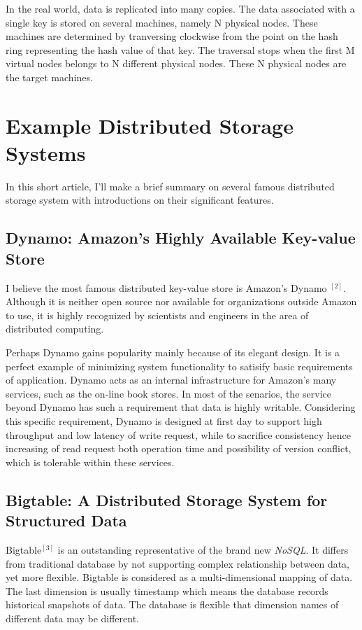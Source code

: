In the real world, data is replicated into many copies. The data associated
with a single key is stored on several machines, namely N physical nodes.
These machines are determined by tranversing clockwise from the point on the
hash ring representing the hash value of that key. The traversal stops when
the first M virtual nodes belongs to N different physical nodes. These N
physical nodes are the target machines.

\section*{Example Distributed Storage Systems}
In this short article, I'll make a brief summary on several famous distributed
storage system with introductions on their significant features.

\subsection*{Dynamo: Amazon's Highly Available Key-value Store}
I believe the most famous distributed key-value store is Amazon's Dynamo
$^{[2]}$. Although it is neither open source nor
available for organizations outside Amazon to use, it is highly recognized by
scientists and engineers in the area of distributed computing.

Perhaps Dynamo gains popularity mainly because of its elegant design. It is a
perfect example of minimizing system functionality to satisify basic
requirements of application. Dynamo acts as an internal infrastructure for
Amazon's many services, such as the on-line book stores. In most of the
senarios, the service beyond Dynamo has such a requirement that data is highly
writable. Considering this specific requirement, Dynamo is designed at first
day to support high throughput and low latency of write request, while to
sacrifice consistency hence increasing of read request both operation time and
possibility of version conflict, which is tolerable within these services.

\subsection*{Bigtable: A Distributed Storage System for Structured Data}
Bigtable$^{[3]}$ is an outstanding representative of the brand
new \emph{NoSQL}. It differs from traditional database by not supporting
complex relationship between data, yet more flexible. Bigtable is considered
as a multi-dimensional mapping of data. The last dimension is usually
timestamp which means the database records historical snapshots of data. The
database is flexible that dimension names of different data may be different.

